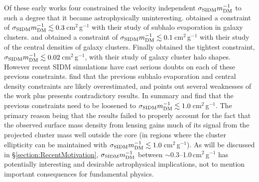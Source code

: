 Of these early works four constrained the velocity independent $\sigma_{\rm SIDM}m_{\rm DM}^{-1}$ to such a degree that it became astrophysically uninteresting.
\citet{Gnedin:2001gd} obtained a constraint of $\sigma_{\rm SIDM}m_{\rm DM}^{-1}\lesssim 0.3$\,cm$^2$\,g$^{-1}$ with their study of subhalo evaporation in galaxy clusters.
\citet{Yoshida:2000gn} and \citet{Meneghetti:2001en} obtained a constraint of $\sigma_{\rm SIDM}m_{\rm DM}^{-1}\lesssim 0.1$\,cm$^2$\,g$^{-1}$ with their study of the central densities of galaxy clusters.
Finally \citet{MiraldaEscude:2002ev} obtained the tightest constraint, $\sigma_{\rm SIDM}m_{\rm DM}^{-1}\lesssim 0.02$\,cm$^2$\,g$^{-1}$, with their study of galaxy cluster halo shapes.
However recent SIDM simulations \citep{Peter:2012vi, Rocha:2012tr} have cast serious doubts on each of these previous constraints.
\citet{Rocha:2012tr} find that the previous subhalo evaporation and central density constraints are likely overestimated, and \citet{Peter:2012vi} points out several weaknesses of the \citet{MiraldaEscude:2002ev} work plus presents contradictory results.
In summary \citet{Peter:2012vi} and \citet{Rocha:2012tr} find that the previous constraints need to be loosened to $\sigma_{\rm SIDM}m_{\rm DM}^{-1}\lesssim 1.0$\,cm$^2$\,g$^{-1}$.
The primary reason being that the \citet{MiraldaEscude:2002ev} results failed to properly account for the fact that the observed surface mass density from lensing gains much of its signal from the projected cluster mass well outside the core (in regions where the cluster ellipticity can be maintained with $\sigma_{\rm SIDM}m_{\rm DM}^{-1}\lesssim 1.0$\,cm$^2$\,g$^{-1}$).
As will be discussed in \S\ref{section:RecentMotivation},  $\sigma_{\rm SIDM}m_{\rm DM}^{-1}$ between $\sim$0.3--1.0\,cm$^2$\,g$^{-1}$ has potentially interesting and desirable astrophysical implications, not to mention important consequences for fundamental physics.

